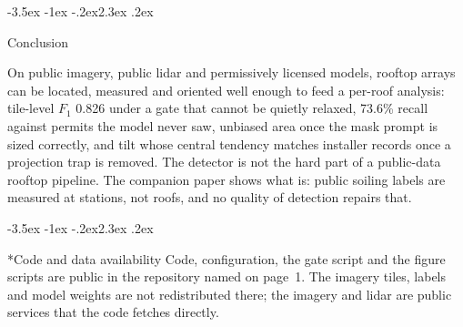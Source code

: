 \documentclass[10pt,twocolumn]{article}
\makeatletter
\renewcommand\section{\@startsection{section}{1}{\z@}%
  {-3.5ex \@plus -1ex \@minus -.2ex}{2.3ex \@plus.2ex}%
  {\normalfont\Large\bfseries\raggedright}}
\makeatother
\begin{document}
\section{Conclusion}
\label{sec:conclusion}

On public imagery, public lidar and permissively licensed models, rooftop arrays can be
located, measured and oriented well enough to feed a per-roof analysis: tile-level $F_1$
0.826 under a gate that cannot be quietly relaxed, 73.6\% recall against permits the model
never saw, unbiased area once the mask prompt is sized correctly, and tilt whose central
tendency matches installer records once a projection trap is removed. The detector is not
the hard part of a public-data rooftop pipeline. The companion paper shows what is: public
soiling labels are measured at stations, not roofs, and no quality of detection repairs
that.

\section*{Code and data availability}
Code, configuration, the gate script and the figure scripts are public in the repository
named on page~1. The imagery tiles, labels and model weights are not redistributed there;
the imagery and lidar are public services that the code fetches directly.



\end{document}
